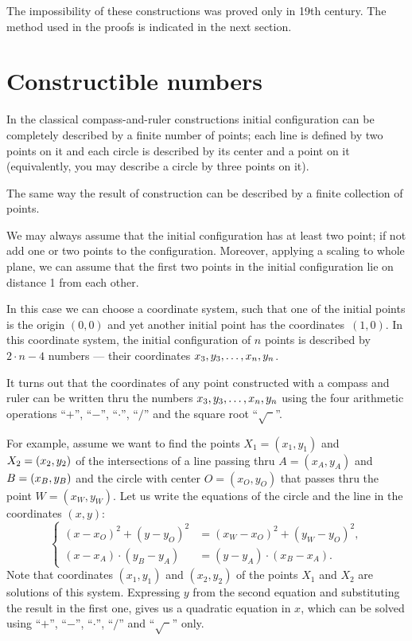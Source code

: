 \medskip

The impossibility of these constructions 
was proved only in 19th century.
The method used in the proofs is indicated in the next section.

\section*{Constructible numbers}

In the classical compass-and-ruler constructions initial configuration can be completely described by a finite number of points;
each line is defined by two points on it and each circle is described by its center and a point on it (equivalently, you may describe a circle by three points on it).

The same way the result of construction can be described by a finite collection of points.

We may always assume that the initial configuration has at least two point;
if not add one or two points to the configuration.
Moreover, applying a scaling to whole plane, we can assume that the first two points in the initial configuration lie on distance 1 from each other.

In this case we can choose a  coordinate system, such that one of the initial points is the origin $(0,0)$ and yet another initial point has the coordinates~$(1,0)$.
In this coordinate system,
the initial configuration of $n$ points is described by 
$2\cdot n-4$ numbers --- their coordinates $x_3,y_3,\z\dots,x_n,y_n$.

\medskip

It turns out that the coordinates of any point constructed with a compass and ruler
can be written thru the numbers $x_3,y_3,\z\dots,x_n,y_n$ using the four arithmetic operations ``$+$'', ``$-$'', ``$\cdot$'', ``$/$''
and the square root ``$\sqrt{\phantom{a}}$''.

For example, assume we want to find the points $X_1=(x_1,y_1)$ and $X_2\z=(x_2,y_2)$ of the intersections of 
a line passing thru $A=(x_A,y_A)$ and $B\z=(x_B,y_B)$ and
the circle with center $O=(x_O,y_O)$ that passes thru the point $W=(x_W,y_W)$.
Let us write the equations of the circle and the line in the coordinates $(x,y)$:
$$
\left\{
\begin{aligned}
(x-x_O)^2+(y-y_O)^2&=(x_W-x_O)^2+(y_W-y_O)^2,
\\
(x-x_A)\cdot(y_B-y_A)&=(y-y_A)\cdot(x_B-x_A).
\end{aligned}
\right.
$$
Note that coordinates $(x_1,y_1)$ and $(x_2,y_2)$ of the points $X_1$ and $X_2$ are solutions of this system.
Expressing $y$ from the second equation and substituting the result in the first one, gives us a quadratic equation in $x$, 
which can be solved using ``$+$'', ``$-$'', ``$\cdot$'', ``$/$''
and  ``$\sqrt{\phantom{a}}$'' only.


